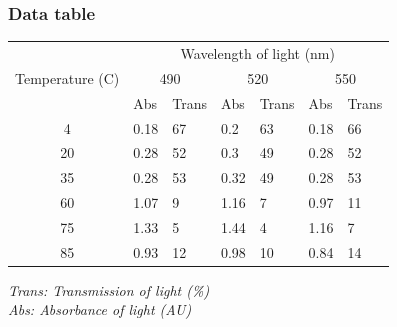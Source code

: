 \documentclass{thomasClass}
\begin{document}
\subsubsection{Data table}
\begin{table}[H]
\centering
\begin{tabularx}{0.8\textwidth}{c|XX|XX|XX}
\multirow{3}{*}{Temperature (C)} & \multicolumn{6}{c}{Wavelength of light (nm)}                                \\
                                 & \multicolumn{2}{c}{490} & \multicolumn{2}{c}{520} & \multicolumn{2}{c}{550} \\
                                 & Abs        & Trans      & Abs        & Trans      & Abs        & Trans      \\
                                 \hline
4                                & 0.18       & 67         & 0.2        & 63         & 0.18       & 66         \\
20                               & 0.28       & 52         & 0.3        & 49         & 0.28       & 52         \\
35                               & 0.28       & 53         & 0.32       & 49         & 0.28       & 53         \\
60                               & 1.07       & 9          & 1.16       & 7          & 0.97       & 11         \\
75                               & 1.33       & 5          & 1.44       & 4          & 1.16       & 7          \\
85                               & 0.93       & 12         & 0.98       & 10         & 0.84       & 14        
\end{tabularx}
\end{table}
\textit{Trans: Transmission of light (\%)}\\
\textit{Abs: Absorbance of light (AU)}
\end{document}
